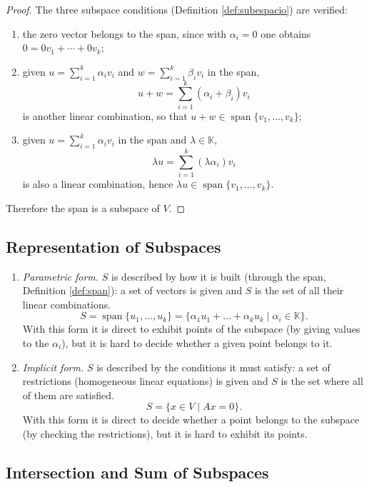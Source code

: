 \documentclass[11pt, a4paper]{article}
\begin{document}
\begin{proof}
The three subspace conditions (Definition \ref{def:subespacio}) are verified:
\begin{enumerate}
    \item the zero vector belongs to the span, since with $\alpha_i = 0$ one obtains $0 = 0v_1 + \cdots + 0v_k$;
    \item given $u = \sum_{i=1}^k \alpha_i v_i$ and $w = \sum_{i=1}^k \beta_i v_i$ in the span,
    \[
    u+w = \sum_{i=1}^k (\alpha_i+\beta_i) v_i
    \]
    is another linear combination, so that $u+w \in \operatorname{span}\{v_1,\dots,v_k\}$;
    \item given $u = \sum_{i=1}^k \alpha_i v_i$ in the span and $\lambda \in \mathbb{K}$,
    \[
    \lambda u = \sum_{i=1}^k (\lambda \alpha_i) v_i
    \]
    is also a linear combination, hence $\lambda u \in \operatorname{span}\{v_1,\dots,v_k\}$.
\end{enumerate}
Therefore the span is a subspace of $V$.
\end{proof}

\subsection{Representation of Subspaces}

\begin{enumerate}
    \item \textit{Parametric form.} $S$ is described by how it is built (through the span,
    Definition \ref{def:span}): a set of vectors is given and $S$ is the set of all their
    linear combinations.
    \[ S = \operatorname{span}\{u_1, \dots, u_k\} = \{ \alpha_1 u_1 + \dots + \alpha_k u_k \mid \alpha_i \in \mathbb{K} \}. \]
    With this form it is direct to exhibit points of the subspace (by giving values to the $\alpha_i$), but it is hard to decide whether a given point belongs to it.

    \item \textit{Implicit form.} $S$ is described by the conditions it must satisfy: a
    set of restrictions (homogeneous linear equations) is given and $S$ is the set where all of them
    are satisfied.
    \[ S = \{ x \in V \mid Ax = 0 \}. \]
    With this form it is direct to decide whether a point belongs to the subspace (by checking the restrictions), but it is hard to exhibit its points.
\end{enumerate}

\subsection{Intersection and Sum of Subspaces}
\end{document}
